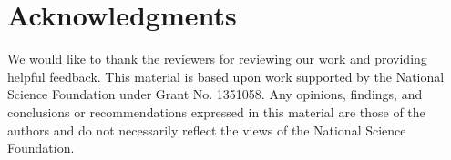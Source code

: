 \documentclass[conference]{IEEEtran}
\begin{document}
\section{Acknowledgments}\label{Acknowledgments}

We would like to thank the reviewers for reviewing our work and providing
helpful feedback. This material is based upon work supported by the National Science Foundation
 under Grant No. 1351058. Any opinions,
findings, and conclusions or recommendations expressed in this material are
those of the authors and do not necessarily reflect the views of the
National Science Foundation.




 


\end{document}
